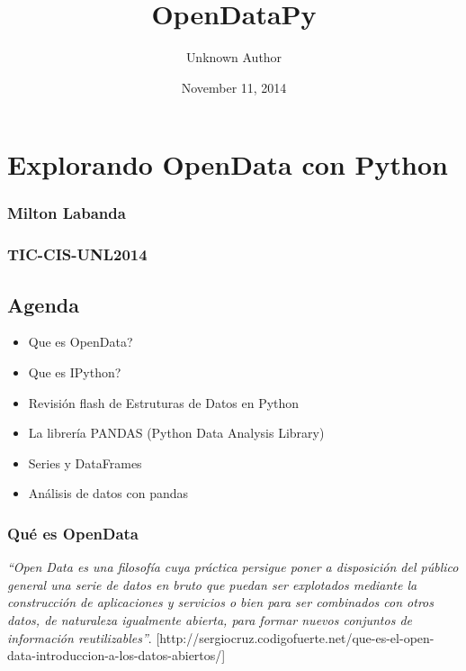 \documentclass[letterpaper,10pt,english]{/usr/local/lib/python2.7/dist-packages/sphinx/texinputs/sphinxhowto}
\title{OpenDataPy}
\date{November 11, 2014}
\author{Unknown Author}
\begin{document}
        
            \maketitle
        

        


        
        \section{Explorando OpenData con
Python}\label{explorando-opendata-con-python}

\subsubsection{Milton Labanda}\label{milton-labanda}

\subsubsection{TIC-CIS-UNL2014}\label{tic-cis-unl2014}\subsection{Agenda}\label{agenda}

\begin{itemize}
\itemsep1pt\parskip0pt
\item
  Que es OpenData?
\item
  Que es IPython?
\item
  Revisión flash de Estruturas de Datos en Python
\item
  La librería PANDAS (Python Data Analysis Library)
\item
  Series y DataFrames
\item
  Análisis de datos con pandas
\end{itemize}\subsubsection{Qué es OpenData}\label{quuxe9-es-opendata}\emph{``Open Data es una filosofía cuya práctica persigue poner a
disposición del público general una serie de datos en bruto que puedan
ser explotados mediante la construcción de aplicaciones y servicios o
bien para ser combinados con otros datos, de naturaleza igualmente
abierta, para formar nuevos conjuntos de información reutilizables''}.
{[}http://sergiocruz.codigofuerte.net/que-es-el-open-data-introduccion-a-los-datos-abiertos/{]}
\end{document}
